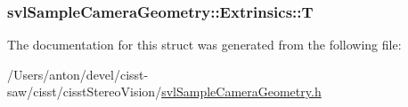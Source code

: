 \subsubsection[{T}]{ svl\+Sample\+Camera\+Geometry\+::\+Extrinsics\+::\+T}\label{structsvl_sample_camera_geometry_1_1_extrinsics_aeeb68b4523c0230563b17f03bc7f5ebe}


The documentation for this struct was generated from the following file\+:\begin{DoxyCompactItemize}
\item 
/\+Users/anton/devel/cisst-\/saw/cisst/cisst\+Stereo\+Vision/\hyperlink{svl_sample_camera_geometry_8h}{svl\+Sample\+Camera\+Geometry.\+h}\end{DoxyCompactItemize}
